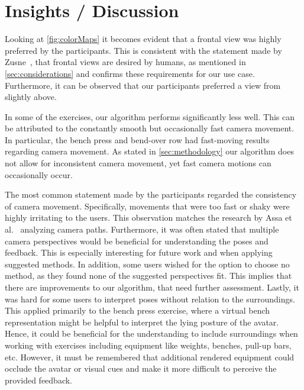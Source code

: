 \section{Insights / Discussion \label{sec:insights}}
Looking at \autoref{fig:colorMaps} it becomes evident that a frontal view was highly preferred by the participants. This is consistent with the statement made by Zusne~\cite{zusne1970vpf}, that frontal views are desired by humans, as mentioned in \autoref{sec:considerations} and confirms these requirements for our use case. Furthermore, it can be observed that our participants preferred a view from slightly above.

In some of the exercises, our algorithm performs significantly less well. This can be attributed to the constantly smooth but occasionally fast camera movement. In particular, the bench press and bend-over row had fast-moving results regarding camera movement. As stated in \autoref{sec:methodology} our algorithm does not allow for inconsistent camera movement, yet fast camera motions can occasionally occur.

The most common statement made by the participants regarded the consistency of camera movement. Specifically, movements that were too fast or shaky were highly irritating to the users. This observation matches the research by Assa et al.~\cite{assa2008moh} analyzing camera paths. Furthermore, it was often stated that multiple camera perspectives would be beneficial for understanding the poses and feedback. This is especially interesting for future work and when applying suggested methods. In addition, some users wished for the option to choose no method, as they found none of the suggested perspectives fit. This implies that there are improvements to our algorithm, that need further assessment. Lastly, it was hard for some users to interpret poses without relation to the surroundings. This applied primarily to the bench press exercise, where a virtual bench representation might be helpful to interpret the lying posture of the avatar. Hence, it could be beneficial for the understanding to include surroundings when working with exercises including equipment like weights, benches, pull-up bars, etc. However, it must be remembered that additional rendered equipment could occlude the avatar or visual cues and make it more difficult to perceive the provided feedback.

